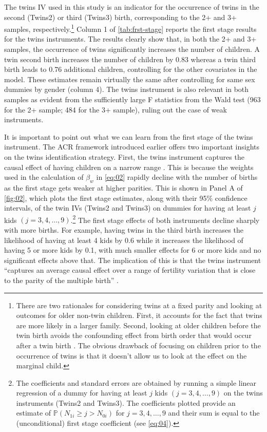 The twins IV used in this study is an indicator for the occurrence of twins in the second (Twins2) or third (Twins3) birth, corresponding to the 2+ and 3+ samples, respectively.\footnote{There are two rationales for considering twins at a fixed parity and looking at outcomes for older non-twin children. First, it accounts for the fact that twins are more likely in a larger family. Second, looking at older children before the twin birth avoids the confounding effect from birth order that would occur after a twin birth \parencite{Black2010}. The obvious drawback of focusing on children prior to the occurrence of twins is that it doesn't allow us to look at the effect on the marginal child.} Column 1 of \autoref{tab:frst-stage} reports the first stage results for the twins instruments. The results clearly show that, in both the 2+ and 3+ samples, the occurrence of twins significantly increases the number of children. A twin second birth increases the number of children by 0.83 whereas a twin third birth leads to 0.76 additional children, controlling for the other covariates in the model. These estimates remain virtually the same after controlling for same sex dummies by gender (column 4).  The twins instrument is also relevant in both samples as evident from the sufficiently large F statistics from the Wald test (963 for the 2+ sample; 484 for the 3+ sample), ruling out the case of weak instruments.

 

It is important to point out what we can learn from the first stage of the twins instrument. The ACR framework introduced earlier offers two important insights on the twins identification strategy. First, the twins instrument captures the causal effect of having children on a narrow range \parencite{angrist_multiple_2010}. This is because the weights used in the calculation of $ \beta_{w} $ in \eqref{eq:02} rapidly decline with the number of births as the first stage gets weaker at higher parities. This is shown in Panel A of \autoref{fig:02}, which plots the first stage estimates, along with their 95\% confidence intervals, of the twin IVs (Twins2 and Twins3) on dummies for having at least $ j $ kids $ (j = 3, 4, \dots, 9) $.\footnote{ The coefficients and standard errors are obtained by running a simple linear regression of a dummy for having at least $ j $ kids $ (j = 3, 4, \dots, 9) $ on the twins instruments (Twins2 and Twins3). The coefficients plotted provide an estimate of $ \mathbb{P}(N_{1i} \geq j > N_{0i}) $ for $ j = 3, 4, \dots, 9 $ and their sum is equal to the (unconditional) first stage coefficient (see \eqref{eq:04}). } The first stage effects of both instruments decline sharply with more births. For example, having twins in the third birth increases the likelihood of having at least 4 kids by 0.6 while it increases the likelihood of having 5 or more kids by 0.1, with much smaller effects for 6 or more kids and no significant effects above that.  The implication of this is that the twins instrument \enquote{captures an average causal effect over a range of fertility variation that is close to the parity of the multiple birth} \parencite[p.~788]{angrist_multiple_2010}. 

